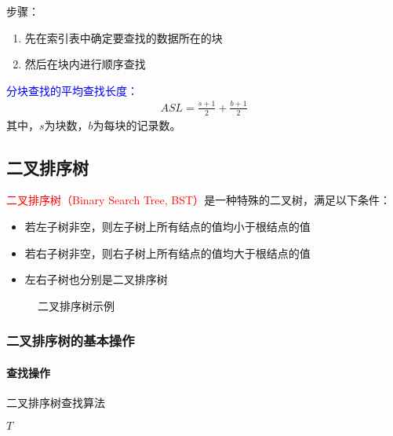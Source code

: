 \documentclass{../../note}
\begin{document}
步骤：
\begin{enumerate}
  \item 先在索引表中确定要查找的数据所在的块
  \item 然后在块内进行顺序查找
\end{enumerate}

\textcolor{blue}{分块查找的平均查找长度：}
\begin{align}
  ASL = \frac{s+1}{2} + \frac{b+1}{2}
\end{align}
其中，$s$为块数，$b$为每块的记录数。

\subsection{二叉排序树}

\textcolor{red}{二叉排序树（Binary Search Tree, BST）}是一种特殊的二叉树，满足以下条件：
\begin{itemize}
  \item 若左子树非空，则左子树上所有结点的值均小于根结点的值
  \item 若右子树非空，则右子树上所有结点的值均大于根结点的值
  \item 左右子树也分别是二叉排序树
\end{itemize}

\begin{figure}[h]
  \centering
  \caption{二叉排序树示例}
\end{figure}

\subsubsection{二叉排序树的基本操作}

\paragraph{查找操作}

\begin{algorithm}
  \caption{二叉排序树查找算法}
  \begin{algorithmic}[1]
    \Return $T$
    \Return {}
    \Else
    \Return {}
    \EndIf
    \EndProcedure
  \end{algorithmic}
\end{algorithm}
\end{document}
